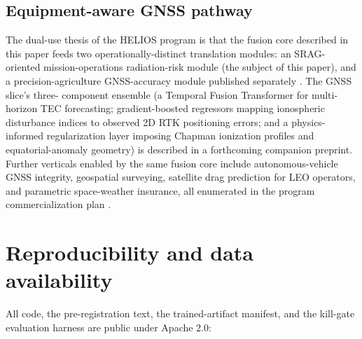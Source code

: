 \documentclass[11pt,letterpaper]{article}
\begin{document}
\subsection{Equipment-aware GNSS pathway}

The dual-use thesis of the HELIOS program is that the fusion core
described in this paper feeds two operationally-distinct translation
modules: an SRAG-oriented mission-operations radiation-risk module
(the subject of this paper), and a precision-agriculture GNSS-accuracy
module published separately \cite{gannon_rtk}.  The GNSS slice's three-
component ensemble (a Temporal Fusion Transformer \cite{lim2021} for
multi-horizon TEC forecasting; gradient-boosted regressors mapping
ionospheric disturbance indices to observed 2D RTK positioning errors;
and a physics-informed regularization layer imposing Chapman ionization
profiles and equatorial-anomaly geometry) is described in a forthcoming
companion preprint.  Further verticals enabled by the same
fusion core include autonomous-vehicle GNSS integrity, geospatial
surveying, satellite drag prediction for LEO operators, and parametric
space-weather insurance, all enumerated in the program commercialization
plan \cite{helios_internal}.

\section{Reproducibility and data availability}
\label{sec:repro}

All code, the pre-registration text, the trained-artifact manifest, and
the kill-gate evaluation harness are public under Apache 2.0:
\end{document}

